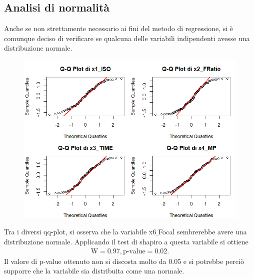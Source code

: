 \subsection{Analisi di normalità}
Anche se non strettamente necessario ai fini del metodo di regressione, si è comunque deciso di verificare se qualcuna delle variabili indipendenti avesse una distribuzione normale.\begin{figure}[h]
	\centering
	\includegraphics[width=0.9\linewidth]{../graphs/DescriptiveStatisticPlots/qqplot1/qqplot1}
	\caption{}
	\label{fig:qqplot1}
\end{figure}
Tra i diversi qq-plot, si osserva che la variabile x6$\_$Focal sembrerebbe avere una distribuzione normale. Applicando il test di shapiro a questa variabile si ottiene
\begin{align*}
	\text{W} = 0.97, \text{p-value} = 0.02.
\end{align*}
Il valore di p-value ottenuto non si discosta molto da 0.05 e si potrebbe perciò supporre che la variabile sia distribuita come una normale.
\begin{figure}[h]
\end{figure}




